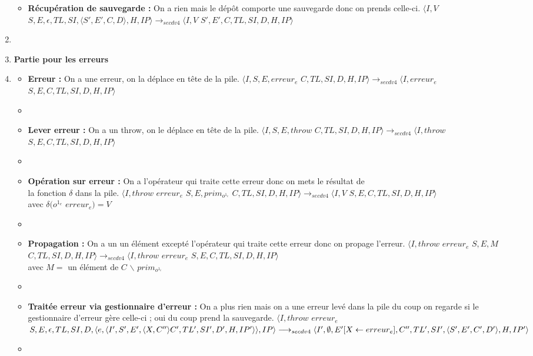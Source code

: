 \documentclass[10pt,a4paper]{article}
\begin{document}
\begin{enumerate}
\begin{itemize}
						\item[] \textbf{Récupération de sauvegarde :}  On a rien mais le dépôt comporte une sauvegarde donc on prends celle-ci.
						\smallbreak  
						$\langle I,V$ $S,E,\epsilon,TL,SI,\langle S',E',C,D\rangle,H,IP\rangle
						\longrightarrow_{secdv4} \langle I,V$ $S',E',C,TL,SI,D,H,IP\rangle$
					\end{itemize}
					\item[]
					\item[] \textbf{Partie pour les erreurs} 
					\item[]
					\begin{itemize}
						\item[] \textbf{Erreur :} On a une erreur, on la déplace en tête de la pile.
						\smallbreak
						$\langle I,S,E,erreur_{e}$ $C,TL,SI,D,H,IP\rangle
						\longrightarrow_{secdv4} \langle I,erreur_{e}$ $S,E,C,TL,SI,D,H,IP\rangle$
						\item[]
						
						\item[] \textbf{Lever erreur :} On a un throw, on le déplace en tête de la pile.
						\smallbreak
						$\langle I,S,E,throw$ $C,TL,SI,D,H,IP\rangle
						\longrightarrow_{secdv4} \langle I,throw$ $S,E,C,TL,SI,D,H,IP\rangle$
						\item[]
						
						\item[] \textbf{Opération sur erreur :} On a l'opérateur qui traite cette erreur donc on mets le résultat de 
						\\la fonction $\delta$ dans la pile.
						\smallbreak
						$\langle I,throw$ $erreur_{e}$ $S,E,prim_{o^{1_{e}}}$ $C,TL,SI,D,H,IP\rangle
						\longrightarrow_{secdv4} \langle I,V$ $S,E,C,TL,SI,D,H,IP\rangle$
						\\ avec $\delta(o^{1_{e}}$ $erreur_{e}) = V$
						\item[]
						
						\item[] \textbf{Propagation :} On a un un élément excepté l'opérateur qui traite cette erreur donc on propage l'erreur.
						\smallbreak
						$\langle I,throw$ $erreur_{e}$ $S,E,M$ $C,TL,SI,D,H,IP\rangle
						\longrightarrow_{secdv4} \langle I,throw$ $erreur_{e}$ $S,E,C,TL,SI,D,H,IP\rangle$ 
						\\avec $M = $ un élément de $C$ $\backslash$ $prim_{o^{1_{e}}}$
						\item[]
						
						\item[] \textbf{Traitée erreur via gestionnaire d'erreur :} On a plus rien mais on a une erreur levé dans la pile du coup on regarde si le gestionnaire d'erreur gère celle-ci ; oui du coup prend la sauvegarde.
						\smallbreak 
						$\langle I,throw$ $erreur_{e}$ $S,E,\epsilon,TL,SI,D,\langle e,\langle I',S',E',\langle X,C'' \rangle C',TL',SI',D',H,IP'\rangle\rangle,IP\rangle \\\longrightarrow_{secdv4} \langle I',\emptyset,E'[X \leftarrow erreur_{e}],C'',TL',SI',\langle S',E',C',D'\rangle,H,IP'\rangle$
						\item[]
						

\end{itemize}
\end{enumerate}
\end{document}
